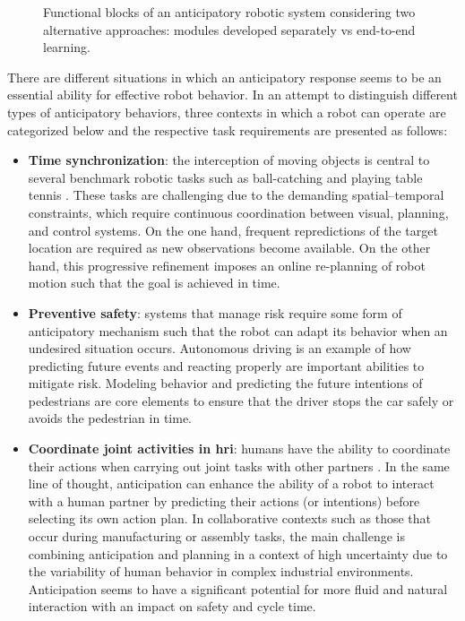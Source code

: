 \begin{figure}[ht]
    \captionsetup{width=0.95\textwidth}
    \centering
    
    \caption{Functional blocks of an anticipatory robotic system considering two alternative approaches: modules developed separately vs end-to-end learning.}
    \label{fig:anticipatorysystem}
\end{figure}

There are different situations in which an anticipatory response seems to be an essential ability for effective robot behavior. In an attempt to distinguish different types of anticipatory behaviors, three contexts in which a robot can operate are categorized below and the respective task requirements are presented as follows:
\begin{itemize}

\item \textbf{Time synchronization}: the interception of moving objects is central to several benchmark robotic tasks such as ball-catching and playing table tennis \cite{Carneiro2021, Wang2017}. These tasks are challenging due to the demanding spatial–temporal constraints, which require continuous coordination between visual, planning, and control systems. On the one hand, frequent repredictions of the target location are required as new observations become available. On the other hand, this progressive refinement imposes an online re-planning of robot motion such that the goal is achieved in time.

\item \textbf{Preventive safety}: systems that manage risk require some form of anticipatory mechanism such that the robot can adapt its behavior when an undesired situation occurs. Autonomous driving is an example of how predicting future events and reacting properly are important abilities to mitigate risk. Modeling behavior and predicting the future intentions of pedestrians are core elements to ensure that the driver stops the car safely or avoids the pedestrian in time.

\item \textbf{Coordinate joint activities in \acf{hri}}: humans have the ability to coordinate their actions when carrying out joint tasks with other partners \cite{Sebanz2006,Hoffman2007}. In the same line of thought, anticipation can enhance the ability of a robot to interact with a human partner by predicting their actions (or intentions) before selecting its own action plan. In collaborative contexts such as those that occur during manufacturing or assembly tasks, the main challenge is combining anticipation and planning in a context of high uncertainty due to the variability of human behavior in complex industrial environments. Anticipation seems to have a significant potential for more fluid and natural interaction with an impact on safety and cycle time.

\end{itemize}

